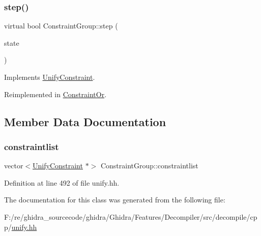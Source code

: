\subsubsection{\texorpdfstring{step()}{step()}}
{\footnotesize\ttfamily virtual bool Constraint\+Group\+::step (\begin{DoxyParamCaption}\item[{\mbox{\hyperlink{class_unify_state}{Unify\+State}} \&}]{state }\end{DoxyParamCaption})\hspace{0.3cm}{\ttfamily [virtual]}}



Implements \mbox{\hyperlink{class_unify_constraint_ad9ab4ad91037f96bf803735d414d212d}{Unify\+Constraint}}.



Reimplemented in \mbox{\hyperlink{class_constraint_or_a04ec591e6f9106bfbdbf9bf76e773aea}{Constraint\+Or}}.



\subsection{Member Data Documentation}
\mbox{\label{class_constraint_group_a218d57fd50d3fadda182398b09c59715}} 
\subsubsection{\texorpdfstring{constraintlist}{constraintlist}}
{\footnotesize\ttfamily vector$<$\mbox{\hyperlink{class_unify_constraint}{Unify\+Constraint}} $\ast$$>$ Constraint\+Group\+::constraintlist\hspace{0.3cm}{\ttfamily [protected]}}



Definition at line 492 of file unify.\+hh.



The documentation for this class was generated from the following file\+:\begin{DoxyCompactItemize}
\item 
F\+:/re/ghidra\+\_\+sourcecode/ghidra/\+Ghidra/\+Features/\+Decompiler/src/decompile/cpp/\mbox{\hyperlink{unify_8hh}{unify.\+hh}}\end{DoxyCompactItemize}
